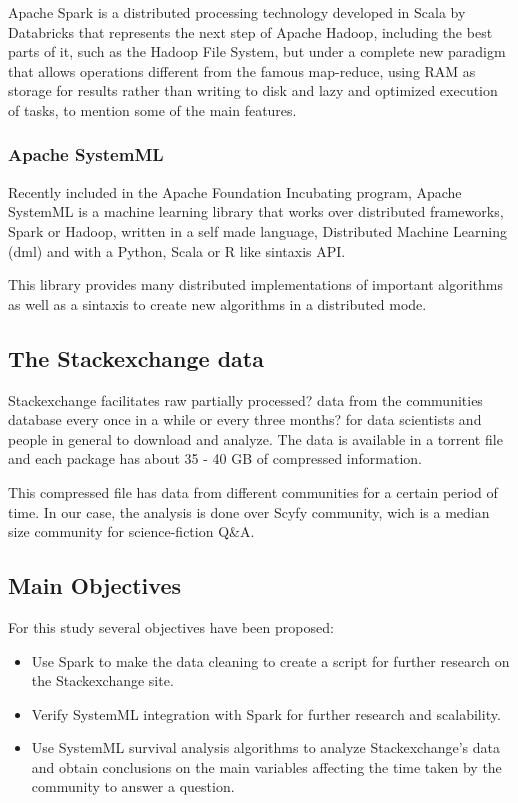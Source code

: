 \documentclass[11pt]{article} %
\begin{document}
Apache Spark is a distributed processing technology developed in Scala by Databricks that represents the next step of Apache Hadoop, including the best parts of it, such as the Hadoop File System, but under a complete new paradigm that allows operations different from the famous map-reduce, using RAM as storage for results rather than writing to disk and lazy and optimized execution of tasks, to mention some of the main features.

\subsubsection{Apache SystemML}

Recently included in the Apache Foundation Incubating  program, Apache SystemML is a machine learning library that works over distributed frameworks, Spark or Hadoop, written in a self made language, Distributed Machine Learning (dml) and with a Python, Scala or R like sintaxis API.

This library provides many distributed implementations of important algorithms as well as a sintaxis to create new algorithms in a distributed mode.

\subsection{The Stackexchange data}

Stackexchange facilitates raw {partially processed?} data from the communities database every once in a while {or every three months?} for data scientists and people in general to download and analyze. The data is available in a torrent file and each package has about 35 - 40 GB of compressed information.

This compressed file has data from different communities for a certain period of time. In our case, the analysis is done over Scyfy community, wich is a median size community for science-fiction Q\&A.

\subsection{Main Objectives}

For this study several objectives have been proposed:

\begin{itemize}

  \item Use Spark to make the data cleaning to create a script for further research on the Stackexchange site.

  \item Verify SystemML integration with Spark for further research and scalability.

  \item Use SystemML survival analysis algorithms to analyze Stackexchange's data and obtain conclusions on the main variables affecting the time taken by the community to answer a question.

\end{itemize}
\end{document}

